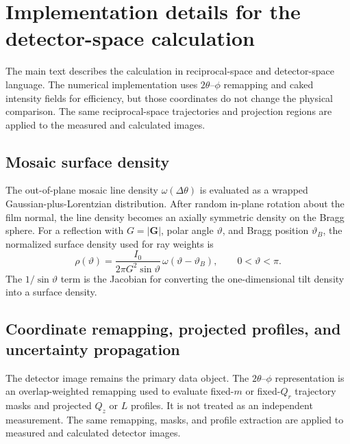 
\section{Implementation details for the detector-space calculation}

The main text describes the calculation in reciprocal-space and detector-space language. The numerical implementation uses $2\theta$--$\phi$ remapping and caked intensity fields for efficiency, but those coordinates do not change the physical comparison. The same reciprocal-space trajectories and projection regions are applied to the measured and calculated images.

\subsection{Mosaic surface density}

The out-of-plane mosaic line density $\omega(\Delta\theta)$ is evaluated as a wrapped Gaussian-plus-Lorentzian distribution. After random in-plane rotation about the film normal, the line density becomes an axially symmetric density on the Bragg sphere. For a reflection with $G=|\mathbf G|$, polar angle $\vartheta$, and Bragg position $\vartheta_B$, the normalized surface density used for ray weights is
\begin{equation}
\rho(\vartheta)=\frac{I_0}{2\pi G^2\sin\vartheta}\,\omega(\vartheta-\vartheta_B),\qquad 0<\vartheta<\pi.
\end{equation}
The $1/\sin\vartheta$ term is the Jacobian for converting the one-dimensional tilt density into a surface density.



\subsection{Coordinate remapping, projected profiles, and uncertainty propagation}

The detector image remains the primary data object. The $2\theta$--$\phi$ representation is an overlap-weighted remapping used to evaluate fixed-$m$ or fixed-$Q_r$ trajectory masks and projected $Q_z$ or $L$ profiles. It is not treated as an independent measurement. The same remapping, masks, and profile extraction are applied to measured and calculated detector images.

